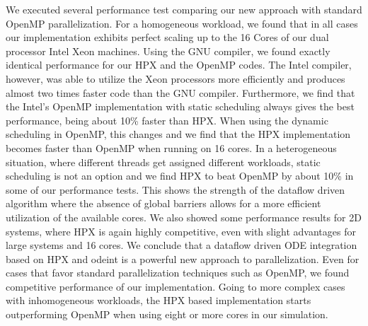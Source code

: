 \documentclass[10pt]{scrartcl}
\begin{document}
We executed several performance test comparing our new approach with standard OpenMP parallelization.
For a homogeneous workload, we found that in all cases our implementation exhibits perfect scaling up to the 16 Cores of our dual processor Intel Xeon machines.
Using the GNU compiler, we found exactly identical performance for our HPX and the OpenMP codes.
The Intel compiler, however, was able to utilize the Xeon processors more efficiently and produces almost two times faster code than the GNU compiler.
Furthermore, we find that the Intel's OpenMP implementation with static scheduling always gives the best performance, being about 10\% faster than HPX.
When using the dynamic scheduling in OpenMP, this changes and we find that the HPX implementation becomes faster than OpenMP when running on 16 cores.
In a heterogeneous situation, where different threads get assigned different workloads, static scheduling is not an option and we find HPX to beat OpenMP by about 10\% in some of our performance tests.
This shows the strength of the dataflow driven algorithm where the absence of global barriers allows for a more efficient utilization of the available cores.
We also showed some performance results for 2D systems, where HPX is again highly competitive, even with slight advantages for large systems and 16 cores.
We conclude that a dataflow driven ODE integration based on HPX and odeint is a powerful new approach to parallelization.
Even for cases that favor standard parallelization techniques such as OpenMP, we found competitive performance of our implementation.
Going to more complex cases with inhomogeneous workloads, the HPX based implementation starts outperforming OpenMP when using eight or more cores in our simulation.
\end{document}
